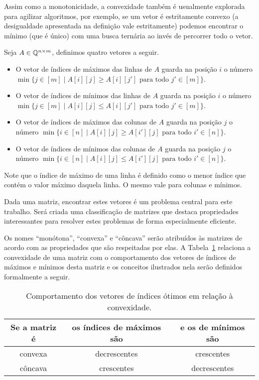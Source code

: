 Assim como a monotonicidade, a convexidade também é usualmente explorada para agilizar algoritmos, por exemplo, se um vetor é estritamente convexo (a desigualdade apresentada na definição vale estritamente) podemos encontrar o mínimo (que é único) com uma busca ternária ao invés de percorrer todo o vetor.  

\begin{defi}
Seja $A \in \mathbb{Q}^{n \times m}$, definimos quatro vetores a seguir.
    \begin{itemize}
        \item O vetor de índices de máximos das linhas de $A$ guarda na posição $i$ 
              o número $\min\{j \in [m] \mid A[i][j] \geq A[i][j'] \text{ para todo } j' \in [m]\}$. 
        \item O vetor de índices de mínimos das linhas de $A$ guarda na posição $i$ 
              o número $\min\{j \in [m] \mid A[i][j] \leq A[i][j'] \text{ para todo } j' \in [m]\}$. 
        \item O vetor de índices de máximos das colunas de $A$ guarda na posição $j$ 
              o número $\min\{i \in [n] \mid A[i][j] \geq A[i'][j] \text{ para todo } i' \in [n]\}$. 
        \item O vetor de índices de mínimos das colunas de $A$ guarda na posição $j$ 
              o número $\min\{i \in [n] \mid A[i][j] \leq A[i'][j] \text{ para todo } i' \in [n]\}$. 
    \end{itemize}

Note que o índice de máximo de uma linha é definido como o menor índice que contém o valor máximo daquela linha. O mesmo vale para colunas e mínimos.
\end{defi}

Dada uma matriz, encontrar estes vetores é um problema central para este trabalho. Será criada uma classificação de matrizes que destaca propriedades interessantes para resolver estes problemas de forma especialmente eficiente.  

Os nomes ``monótona'', ``convexa'' e ``côncava'' serão atribuídos às matrizes de acordo com as propriedades que são respeitadas por elas. A Tabela~\ref{table:ConvexMonotone} relaciona a convexidade de uma matriz com o comportamento dos vetores de índices de máximos e mínimos desta matriz e os conceitos ilustrados nela serão definidos formalmente a seguir.  

\begin{table} 
    \caption{Comportamento dos vetores de índices ótimos em relação à convexidade.} \label{table:ConvexMonotone}
    \begin{tabular}{ c | c | c }
        Se a matriz é & os índices de máximos são & e os de mínimos são \\
        \hline
        convexa       & decrescentes              & crescentes        \\
        \hline
        côncava       & crescentes                & decrescentes          \\
    \end{tabular}
\end{table}

